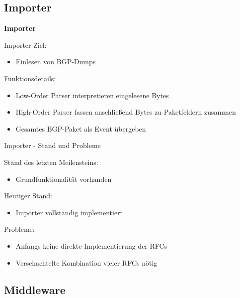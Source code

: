 \documentclass[9pt]{beamer}
\begin{document}
\subsection{Importer}

\begin{frame}{}
	\begin{center}
		\LARGE \textbf{Importer}
	\end{center}
\end{frame}

\begin{frame}{Importer}{}
   Ziel:
   	\begin{itemize}
   	\item Einlesen von BGP-Dumps
   	\end{itemize}
   	\vspace{0,3cm}
   Funktionsdetails:
	\begin{itemize}
		\item Low-Order Parser interpretieren eingelesene Bytes
		\item High-Order Parser fassen anschließend Bytes zu Paketfeldern zusammen
		\item Gesamtes BGP-Paket als Event übergeben
	\end{itemize}
\end{frame}

\begin{frame}{Importer - Stand und Probleme}{}

	Stand des letzten Meilensteins:
	\begin{itemize}
		\item Grundfunktionalität vorhanden
	\end{itemize}
	\vspace{0,3cm}
	Heutiger Stand:
	\begin{itemize}
		\item Importer vollständig implementiert
	\end{itemize}
	\vspace{0,3cm}
	Probleme:
	\begin{itemize}
		\item Anfangs keine direkte Implementierung der RFCs
		\item Verschachtelte Kombination vieler RFCs nötig
	\end{itemize}
\end{frame}

\subsection{Middleware}
\end{document}
